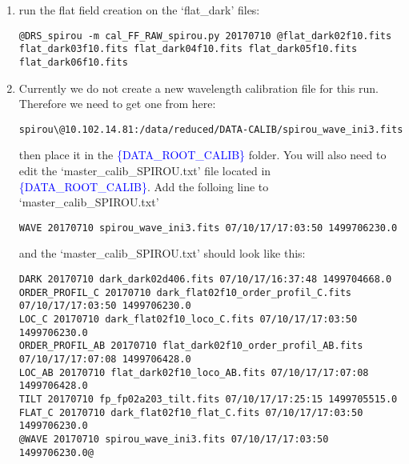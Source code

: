 \begin{enumerate}
\item run the flat field creation on the `flat\_dark' files:
\begin{lstlisting}[style=bashstyle]
@DRS_spirou -m cal_FF_RAW_spirou.py 20170710 @flat_dark02f10.fits flat_dark03f10.fits flat_dark04f10.fits flat_dark05f10.fits flat_dark06f10.fits
\end{lstlisting}  

\item Currently we do not create a new wavelength calibration file for this run. Therefore we need to get one from here:
\begin{lstlisting}[style=bashstyle]
spirou\@10.102.14.81:/data/reduced/DATA-CALIB/spirou_wave_ini3.fits
\end{lstlisting}  

\noindent then place it in the \textcolor{blue}{\{DATA\_ROOT\_CALIB\}} folder. You will also need to edit the `master\_calib\_SPIROU.txt' file located in \textcolor{blue}{\{DATA\_ROOT\_CALIB\}}. Add the folloing line to `master\_calib\_SPIROU.txt'
\begin{lstlisting}[style=text]
WAVE 20170710 spirou_wave_ini3.fits 07/10/17/17:03:50 1499706230.0
\end{lstlisting}

\noindent and the `master\_calib\_SPIROU.txt' should look like this:
\begin{lstlisting}[style=text]
DARK 20170710 dark_dark02d406.fits 07/10/17/16:37:48 1499704668.0
ORDER_PROFIL_C 20170710 dark_flat02f10_order_profil_C.fits 07/10/17/17:03:50 1499706230.0
LOC_C 20170710 dark_flat02f10_loco_C.fits 07/10/17/17:03:50 1499706230.0
ORDER_PROFIL_AB 20170710 flat_dark02f10_order_profil_AB.fits 07/10/17/17:07:08 1499706428.0
LOC_AB 20170710 flat_dark02f10_loco_AB.fits 07/10/17/17:07:08 1499706428.0
TILT 20170710 fp_fp02a203_tilt.fits 07/10/17/17:25:15 1499705515.0
FLAT_C 20170710 dark_flat02f10_flat_C.fits 07/10/17/17:03:50 1499706230.0
@WAVE 20170710 spirou_wave_ini3.fits 07/10/17/17:03:50 1499706230.0@
\end{lstlisting}


\end{enumerate}
